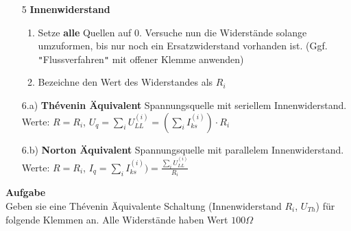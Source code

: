 																				  \iend
																				\begin{itemize}

																				  \item[5] \textbf{Innenwiderstand}
																				  \begin{enumerate}
																				    \item Setze \textbf{alle} Quellen auf 0. Versuche nun die Widerstände solange umzuformen, bis nur noch ein Ersatzwiderstand vorhanden ist. (Ggf. \texttt{"}Flussverfahren\texttt{"} mit offener Klemme anwenden)
																				    \item Bezeichne den Wert des Widerstandes als $R_i$
																				  \end{enumerate}
																				  \item[6.a)] \textbf{Thévenin Äquivalent} Spannungsquelle mit seriellem Innenwiderstand. \\
																				  Werte: $\displaystyle   R= R_i$, $U_q = \sum_i U_{LL}^{(i)} = (\sum_i I_{ks}^{(i)})\cdot R_i$

																				  \item[6.b)] \textbf{Norton Äquivalent} Spannungsquelle mit parallelem Innenwiderstand. \\
																				  Werte: $\displaystyle  R= R_i$, $I_q = \sum_i I_{ks}^{(i)}) = \frac{\sum_i U_{LL}^{(i)}}{R_i}$

																				  \end{itemize}

																				\iend






																				\beginip
																				\textbf{Aufgabe}
																				\\Geben sie eine Thévenin Äquivalente Schaltung (Innenwiderstand $R_i$, $U_{Th}$) für folgende Klemmen an. Alle Widerstände haben Wert $100\Omega$ \\

